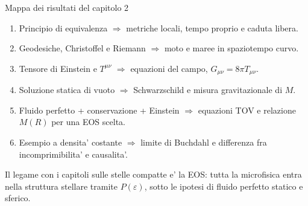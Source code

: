 \begin{frame}[t]{Mappa dei risultati del capitolo 2}\small\raggedright

\begin{enumerate}
\item Principio di equivalenza $\Rightarrow$ metriche locali, tempo proprio e caduta libera.
\item Geodesiche, Christoffel e Riemann $\Rightarrow$ moto e maree in spaziotempo curvo.
\item Tensore di Einstein e $T^{\mu\nu}$ $\Rightarrow$ equazioni del campo, $G_{\mu\nu}=8\pi T_{\mu\nu}$.
\item Soluzione statica di vuoto $\Rightarrow$ Schwarzschild e misura gravitazionale di $M$.
\item Fluido perfetto + conservazione + Einstein $\Rightarrow$ equazioni TOV e relazione $M(R)$ per una EOS scelta.
\item Esempio a densita' costante $\Rightarrow$ limite di Buchdahl e differenza fra incomprimibilita' e causalita'.
\end{enumerate}
\medskip
Il legame con i capitoli sulle stelle compatte e' la EOS: tutta la microfisica entra nella struttura stellare tramite $P(\varepsilon)$, sotto le ipotesi di fluido perfetto statico e sferico.

\end{frame}

